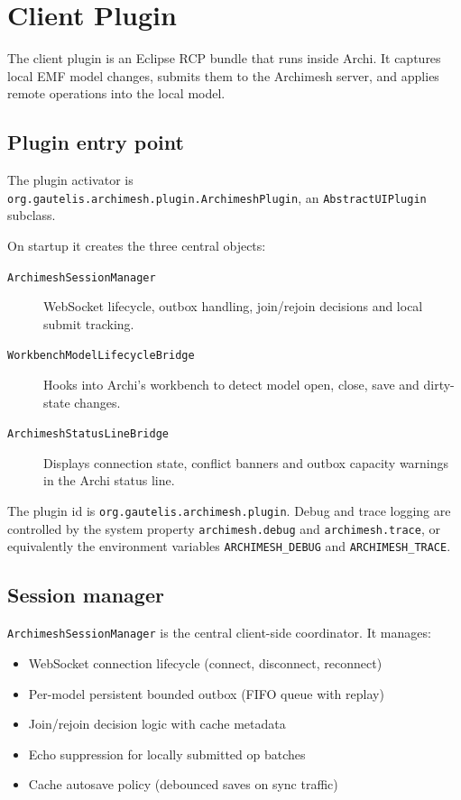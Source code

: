 \section{Client Plugin}
\label{sec:ClientPlugin}

The client plugin is an Eclipse RCP bundle that runs inside Archi. It captures
local EMF model changes, submits them to the Archimesh server, and applies
remote operations into the local model.

\subsection{Plugin entry point}

The plugin activator is \\ \texttt{org.gautelis.archimesh.plugin.ArchimeshPlugin},
an \texttt{AbstractUIPlugin} subclass.

On startup it creates the three central objects:

\begin{description}
\item[\texttt{ArchimeshSessionManager}] WebSocket lifecycle, outbox handling,
  join/rejoin decisions and local submit tracking.
\item[\texttt{WorkbenchModelLifecycleBridge}] Hooks into Archi's workbench to
  detect model open, close, save and dirty-state changes.
\item[\texttt{ArchimeshStatusLineBridge}] Displays connection state, conflict
  banners and outbox capacity warnings in the Archi status line.
\end{description}

The plugin id is \texttt{org.gautelis.archimesh.plugin}. Debug and trace
logging are controlled by the system property \texttt{archimesh.debug} and
\texttt{archimesh.trace}, or equivalently the environment variables
\texttt{ARCHIMESH\_DEBUG} and \texttt{ARCHIMESH\_TRACE}.

\subsection{Session manager}

\texttt{ArchimeshSessionManager} is the central client-side coordinator. It
manages:

\begin{itemize}
\item WebSocket connection lifecycle (connect, disconnect, reconnect)
\item Per-model persistent bounded outbox (FIFO queue with replay)
\item Join/rejoin decision logic with cache metadata
\item Echo suppression for locally submitted op batches
\item Cache autosave policy (debounced saves on sync traffic)
\end{itemize}

